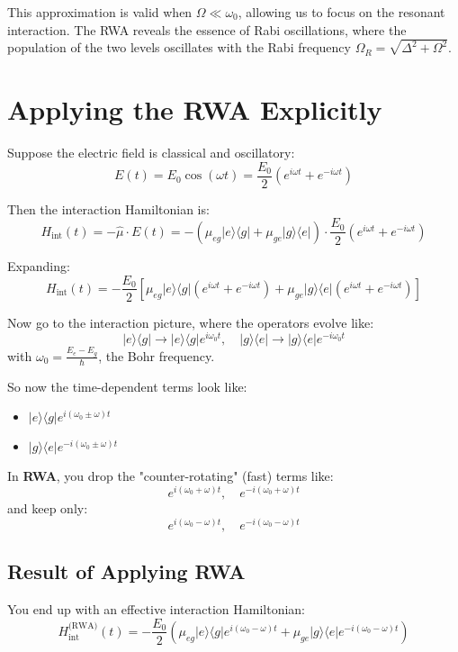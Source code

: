 This approximation is valid when \(\Omega \ll \omega_0\), allowing us to focus on the resonant interaction. The RWA reveals the essence of Rabi oscillations, where the population of the two levels oscillates with the Rabi frequency \(\Omega_R = \sqrt{\Delta^2 + \Omega^2}\).



\section{Applying the RWA Explicitly}

Suppose the electric field is classical and oscillatory:
\[
	E(t) = E_0 \cos(\omega t) = \frac{E_0}{2}\left(e^{i\omega t} + e^{-i\omega t}\right)
\]

Then the interaction Hamiltonian is:
\[
	H_{\text{int}}(t) = -\hat{\mu} \cdot E(t)
	= -\left(\mu_{eg} |e\rangle\langle g| + \mu_{ge} |g\rangle\langle e|\right) \cdot \frac{E_0}{2}\left(e^{i\omega t} + e^{-i\omega t}\right)
\]

Expanding:
\[
	H_{\text{int}}(t) = -\frac{E_0}{2} \left[
		\mu_{eg} |e\rangle\langle g| \left(e^{i\omega t} + e^{-i\omega t}\right) +
		\mu_{ge} |g\rangle\langle e| \left(e^{i\omega t} + e^{-i\omega t}\right)
		\right]
\]

Now go to the interaction picture, where the operators evolve like:
\[
	|e\rangle\langle g| \rightarrow |e\rangle\langle g| e^{i\omega_0 t}, \quad |g\rangle\langle e| \rightarrow |g\rangle\langle e| e^{-i\omega_0 t}
\]
with \(\omega_0 = \frac{E_e - E_g}{\hbar}\), the Bohr frequency.

So now the time-dependent terms look like:
\begin{itemize}
	\item \(|e\rangle\langle g| e^{i(\omega_0 \pm \omega)t}\)
	\item \(|g\rangle\langle e| e^{-i(\omega_0 \pm \omega)t}\)
\end{itemize}

In \textbf{RWA}, you drop the "counter-rotating" (fast) terms like:
\[
	e^{i(\omega_0 + \omega)t}, \quad e^{-i(\omega_0 + \omega)t}
\]
and keep only:
\[
	e^{i(\omega_0 - \omega)t}, \quad e^{-i(\omega_0 - \omega)t}
\]

\subsection*{Result of Applying RWA}

You end up with an effective interaction Hamiltonian:
\[
	H_{\text{int}}^{\text{(RWA)}}(t) = -\frac{E_0}{2} \left(
	\mu_{eg} |e\rangle\langle g| e^{i(\omega_0 - \omega)t} +
	\mu_{ge} |g\rangle\langle e| e^{-i(\omega_0 - \omega)t}
	\right)
\]

